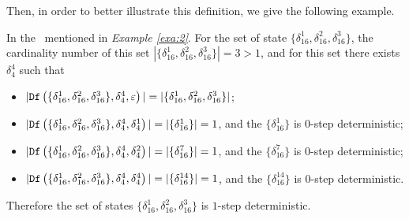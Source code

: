  Then, in order to better illustrate this definition, we give the following example.
\begin{example}
In the \BCN\ mentioned in {\em Example \ref{exa:2}}. For the set of state $\{\delta_{16}^1,\delta_{16}^2,\delta_{16}^3\}$, the cardinality number of this set $|\{\delta_{16}^1,\delta_{16}^2,\delta_{16}^3\}|=3>1$, and for this set there exists $\delta_{4}^4$ such that 
 \begin{itemize}
 \item  $|{\tt Df}\left(\{\delta_{16}^1,\delta_{16}^2,\delta_{16}^3\},\delta_{4}^4,\varepsilon\right)|=|\{\delta_{16}^1,\delta_{16}^2,\delta_{16}^3\}|$;
 \item  $|{\tt Df}\left(\{\delta_{16}^1,\delta_{16}^2,\delta_{16}^3\},\delta_{4}^4,\delta_{4}^1\right)|=|\{\delta_{16}^1\}|=1$, and the $\{\delta_{16}^1\}$ is $0$-step deterministic;
 \item  $|{\tt Df}\left(\{\delta_{16}^1,\delta_{16}^2,\delta_{16}^3\},\delta_{4}^4,\delta_{4}^2\right)|=|\{\delta_{16}^7\}|=1$, and the $\{\delta_{16}^7\}$ is $0$-step deterministic;
  \item  $|{\tt Df}\left(\{\delta_{16}^1,\delta_{16}^2,\delta_{16}^3\},\delta_{4}^4,\delta_{4}^4\right)|=|\{\delta_{16}^{14}\}|=1$, and the $\{\delta_{16}^{14}\}$ is $0$-step deterministic.
 \end{itemize}
 Therefore the set of states $\{\delta_{16}^1,\delta_{16}^2,\delta_{16}^3\}$ is $1$-step deterministic.
\end{example}  

